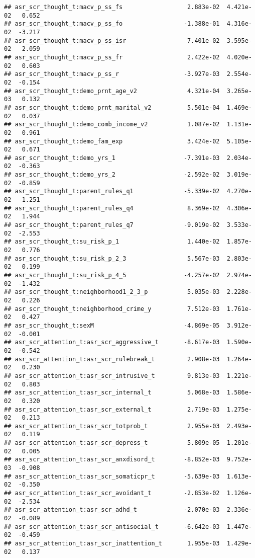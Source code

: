 \documentclass[
]{article}
\begin{document}
\begin{verbatim}
## asr_scr_thought_t:macv_p_ss_fs                  2.883e-02  4.421e-02   0.652
## asr_scr_thought_t:macv_p_ss_fo                 -1.388e-01  4.316e-02  -3.217
## asr_scr_thought_t:macv_p_ss_isr                 7.401e-02  3.595e-02   2.059
## asr_scr_thought_t:macv_p_ss_fr                  2.422e-02  4.020e-02   0.603
## asr_scr_thought_t:macv_p_ss_r                  -3.927e-03  2.554e-02  -0.154
## asr_scr_thought_t:demo_prnt_age_v2              4.321e-04  3.265e-03   0.132
## asr_scr_thought_t:demo_prnt_marital_v2          5.501e-04  1.469e-02   0.037
## asr_scr_thought_t:demo_comb_income_v2           1.087e-02  1.131e-02   0.961
## asr_scr_thought_t:demo_fam_exp                  3.424e-02  5.105e-02   0.671
## asr_scr_thought_t:demo_yrs_1                   -7.391e-03  2.034e-02  -0.363
## asr_scr_thought_t:demo_yrs_2                   -2.592e-02  3.019e-02  -0.859
## asr_scr_thought_t:parent_rules_q1              -5.339e-02  4.270e-02  -1.251
## asr_scr_thought_t:parent_rules_q4               8.369e-02  4.306e-02   1.944
## asr_scr_thought_t:parent_rules_q7              -9.019e-02  3.533e-02  -2.553
## asr_scr_thought_t:su_risk_p_1                   1.440e-02  1.857e-02   0.776
## asr_scr_thought_t:su_risk_p_2_3                 5.567e-03  2.803e-02   0.199
## asr_scr_thought_t:su_risk_p_4_5                -4.257e-02  2.974e-02  -1.432
## asr_scr_thought_t:neighborhood1_2_3_p           5.035e-03  2.228e-02   0.226
## asr_scr_thought_t:neighborhood_crime_y          7.512e-03  1.761e-02   0.427
## asr_scr_thought_t:sexM                         -4.869e-05  3.912e-02  -0.001
## asr_scr_attention_t:asr_scr_aggressive_t       -8.617e-03  1.590e-02  -0.542
## asr_scr_attention_t:asr_scr_rulebreak_t         2.908e-03  1.264e-02   0.230
## asr_scr_attention_t:asr_scr_intrusive_t         9.813e-03  1.221e-02   0.803
## asr_scr_attention_t:asr_scr_internal_t          5.068e-03  1.586e-02   0.320
## asr_scr_attention_t:asr_scr_external_t          2.719e-03  1.275e-02   0.213
## asr_scr_attention_t:asr_scr_totprob_t           2.955e-03  2.493e-02   0.119
## asr_scr_attention_t:asr_scr_depress_t           5.809e-05  1.201e-02   0.005
## asr_scr_attention_t:asr_scr_anxdisord_t        -8.852e-03  9.752e-03  -0.908
## asr_scr_attention_t:asr_scr_somaticpr_t        -5.639e-03  1.613e-02  -0.350
## asr_scr_attention_t:asr_scr_avoidant_t         -2.853e-02  1.126e-02  -2.534
## asr_scr_attention_t:asr_scr_adhd_t             -2.070e-03  2.336e-02  -0.089
## asr_scr_attention_t:asr_scr_antisocial_t       -6.642e-03  1.447e-02  -0.459
## asr_scr_attention_t:asr_scr_inattention_t       1.955e-03  1.429e-02   0.137

\end{verbatim}
\end{document}
